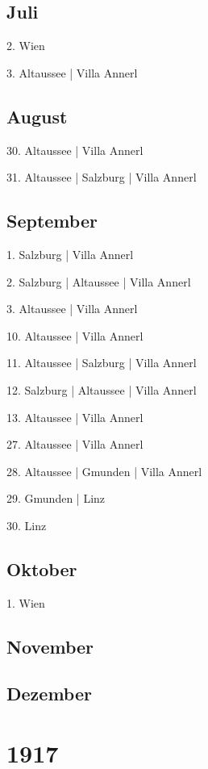 \documentclass[twoside=false,titlepage=false,open=any, parskip=never, fontsize=10pt, headings=small, chapterprefix=false, appendixprefix=false, DIV=15]{scrbook}
\begin{document}
\begin{multicols}{3}
            \section*{Juli}
            2. Wien\par
            3. Altaussee | Villa Annerl\par
            \section*{August}
            30. Altaussee | Villa Annerl\par
            31. Altaussee | Salzburg | Villa Annerl\par
            \section*{September}
            1. Salzburg | Villa Annerl\par
            2. Salzburg | Altaussee | Villa Annerl\par
            3. Altaussee | Villa Annerl\par
            10. Altaussee | Villa Annerl\par
            11. Altaussee | Salzburg | Villa Annerl\par
            12. Salzburg | Altaussee | Villa Annerl\par
            13. Altaussee | Villa Annerl\par
            27. Altaussee | Villa Annerl\par
            28. Altaussee | Gmunden | Villa Annerl\par
            29. Gmunden | Linz\par
            30. Linz\par
            \section*{Oktober}
            1. Wien\par
            \section*{November}
            \section*{Dezember}
            \chapter*{1917}

\end{multicols}
\end{document}

